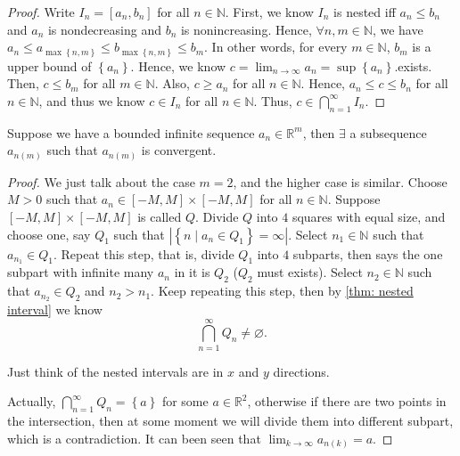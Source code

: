 \begin{proof}
    Write \(I_n = [a_n,b_n]\) for all \(n \in \mathbb{N} \). First, we know \(I_n\) is nested iff \(a_n \le b_n\) and \(a_n\) is nondecreasing and \(b_n\) is nonincreasing. Hence, \(\forall n,m \in \mathbb{N} \), we have \(a_n \le a_{\max \left\{ n,m \right\} } \le b_{\max \left\{ n,m \right\} } \le b_m\). In other words, for every \(m \in \mathbb{N} \), \(b_m\) is a upper bound of \(\left\{ a_n \right\} \). Hence, we know \(c = \lim_{n \to \infty} a_n  = \sup \left\{ a_n \right\} \).exists. Then, \(c \le b_m\) for all \(m \in \mathbb{N} \). Also, \(c \ge a_n\) for all \(n \in \mathbb{N} \). Hence, \(a_n \le c \le b_n\) for all \(n \in \mathbb{N} \), and thus we know \(c \in I_n\) for all \(n \in \mathbb{N} \). Thus, \(c \in \bigcap_{n=1}^{\infty} I_n \).                     
\end{proof}

\begin{theorem} \label{thm: Bolzano Weierstrass thm}
    Suppose we have a bounded infinite sequence \(a_n \in \mathbb{R} ^m\), then \(\exists \) a subsequence \(a_{n(m)}\) such that \(a_{n(m)}\) is convergent.   
\end{theorem}
\begin{proof}
    We just talk about the case \(m=2\), and the higher case is similar. Choose \(M>0\) such that \(a_n \in [-M,M] \times [-M,M]\) for all \(n \in \mathbb{N} \). Suppose \([-M,M] \times [-M,M]\) is called \(Q\). Divide \(Q\) into \(4\) squares with equal size, and choose one, say \(Q_1\) such that \(\left\vert \left\{ n \mid a_n \in Q_1 \right\} = \infty   \right\vert \). Select \(n_1 \in \mathbb{N} \) such that \(a_{n_1} \in Q_1\). Repeat this step, that is, divide \(Q_1\) into \(4\) subparts, then says the one subpart with infinite many \(a_n\) in it is \(Q_2\) (\(Q_2\) must exists). Select \(n_2 \in \mathbb{N} \) such that \(a_{n_2} \in Q_2\) and \(n_2 > n_1\). Keep repeating this step, then by \autoref{thm: nested interval} we know
    \[
        \bigcap_{n=1}^{\infty} Q_n \neq \varnothing.
    \] 
    \begin{note}
        Just think of the nested intervals are in \(x\) and \(y\) directions.  
    \end{note}
    Actually, \(\bigcap_{n=1}^{\infty} Q_n = \left\{ a \right\} \) for some \(a \in \mathbb{R} ^2\), otherwise if there are two points in the intersection, then at some moment we will divide them into different subpart, which is a contradiction. It can been seen that \(\lim_{k \to \infty} a_{n(k)} = a\).   
\end{proof}


